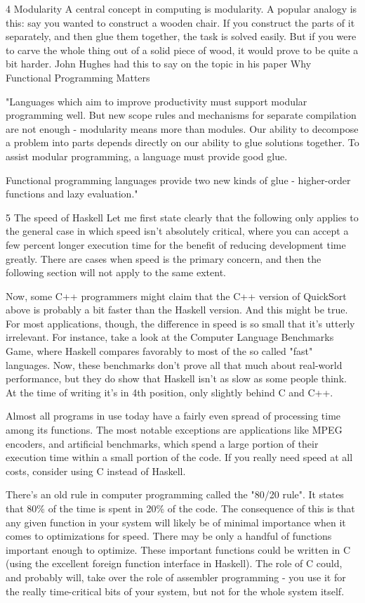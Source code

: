 \documentclass{report}
\begin{document}
4 Modularity
A central concept in computing is modularity. A popular analogy is this: say you wanted to construct a wooden chair. If you construct the parts of it separately, and then glue them together, the task is solved easily. But if you were to carve the whole thing out of a solid piece of wood, it would prove to be quite a bit harder. John Hughes had this to say on the topic in his paper Why Functional Programming Matters

"Languages which aim to improve productivity must support modular programming well. But new scope rules and mechanisms for separate compilation are not enough - modularity means more than modules. Our ability to decompose a problem into parts depends directly on our ability to glue solutions together. To assist modular programming, a language must provide good glue.

Functional programming languages provide two new kinds of glue - higher-order functions and lazy evaluation."


5 The speed of Haskell
Let me first state clearly that the following only applies to the general case in which speed isn't absolutely critical, where you can accept a few percent longer execution time for the benefit of reducing development time greatly. There are cases when speed is the primary concern, and then the following section will not apply to the same extent.

Now, some C++ programmers might claim that the C++ version of QuickSort above is probably a bit faster than the Haskell version. And this might be true. For most applications, though, the difference in speed is so small that it's utterly irrelevant. For instance, take a look at the Computer Language Benchmarks Game, where Haskell compares favorably to most of the so called "fast" languages. Now, these benchmarks don't prove all that much about real-world performance, but they do show that Haskell isn't as slow as some people think. At the time of writing it's in 4th position, only slightly behind C and C++.

Almost all programs in use today have a fairly even spread of processing time among its functions. The most notable exceptions are applications like MPEG encoders, and artificial benchmarks, which spend a large portion of their execution time within a small portion of the code. If you really need speed at all costs, consider using C instead of Haskell.

There's an old rule in computer programming called the "80/20 rule". It states that 80\% of the time is spent in 20\% of the code. The consequence of this is that any given function in your system will likely be of minimal importance when it comes to optimizations for speed. There may be only a handful of functions important enough to optimize. These important functions could be written in C (using the excellent foreign function interface in Haskell). The role of C could, and probably will, take over the role of assembler programming - you use it for the really time-critical bits of your system, but not for the whole system itself.
\end{document}
